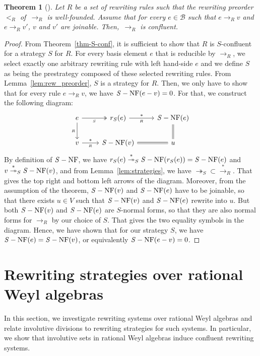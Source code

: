 \documentclass[11pt]{article}
\newtheorem{theorem}{Theorem}[section]
\theoremstyle{definition}
\newcommand\basis{\mathscr{B}}
\newcommand\ordR{<_R}
\newcommand\rewR{\to_R}
\newcommand\parS{\twoheadrightarrow_S}
\newcommand\transR{\overset{*}{\to}_R}
\newcommand\transS{\overset{*}{\twoheadrightarrow}_S}
\DeclareMathOperator{\SNF}{{\it S}-NF}
\begin{document}
\begin{theorem}[\cite{MR506890}]\label{thm:diamond_lemma}
  Let $R$ be a set of rewriting rules such that the rewriting preorder
  $\ordR$ of~$\rewR$ is well-founded. Assume that  for every $e\in\basis$
  such that $e\rewR v$ and $e\rewR v'$, $v$ and $v'$ are joinable. 
  Then,~$\rewR$ is confluent.
\end{theorem}

\begin{proof}
  From Theorem~\ref{thm-S-conf}, it is sufficient to show that $R$ is
  $S$-confluent for a strategy $S$ for $R$. For every basis element $e$
  that is reducible by $\rewR$, we select exactly one arbitrary rewriting
  rule with left hand-side $e$ and we define $S$ as being the prestrategy
  composed of these selected rewriting rules. From
  Lemma~\ref{lem:rew_preorder}, $S$ is a strategy for $R$. Then, we only
  have to show that for every rule $e\rewR v$, we have $\SNF(e-v)=0$. For
  that, we construct the following diagram:
  \[\begin{tikzcd}
  e\ar[d, "_R"']\ar[r, twoheadrightarrow, "_S"'] & 
  r_S(e)\ar[r, "*", "_R"'] & \SNF(e)\ar[d, equal]\\
  v\ar[r, "*", "_R"'] & \SNF(v)\ar[r, equal] & u
  \end{tikzcd}\]
  By definition of $\SNF$, we have $r_S(e)\transS\SNF(r_S(e))=\SNF(e)$
  and $v\transS\SNF(v)$, and from Lemma~\ref{lem:strategies}, we have
  $\parS\subset\transR$. That gives the top right and bottom left arrows
  of the diagram. Moreover, from the assumption of the theorem, $\SNF(v)$
  and $\SNF(e)$ have to be joinable, so that there exists $u\in V$ such
  that $\SNF(v)$ and $\SNF(e)$ rewrite into $u$. But both $\SNF(v)$ and
  $\SNF(e)$ are $S$-normal forms, so that they are also normal forms for
  $\rewR$ by our choice of $S$. That gives the two equality symbols in
  the diagram. Hence, we have shown that for our strategy $S$, we have
  $\SNF(e)=\SNF(v)$, or equivalently $\SNF(e-v)=0$.
\end{proof}

\section{Rewriting strategies over rational Weyl algebras}
\label{sec:rewriting_strategies_over_rational_Weyl_algebras}

In this section, we investigate rewriting systems over rational Weyl
algebras and relate involutive divisions to rewriting strategies for such
systems. In particular, we show that involutive sets in rational Weyl
algebras induce confluent rewriting systems.
\medskip
\end{document}
